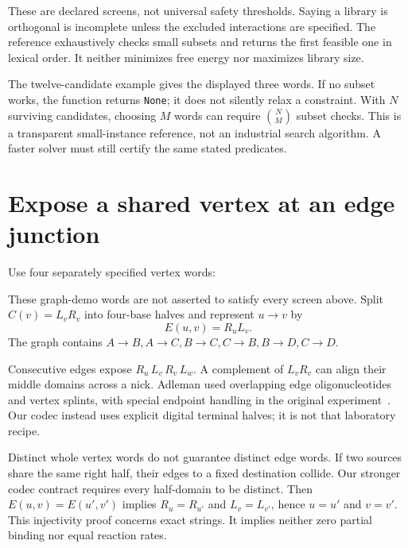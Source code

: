 These are declared screens, not universal safety thresholds. Saying a library
is orthogonal is incomplete unless the excluded interactions are specified.
The reference exhaustively checks small subsets and returns the first feasible
one in lexical order. It neither minimizes free energy nor maximizes library size.
\begin{center}\end{center}
The twelve-candidate example gives the displayed three words. If no subset
works, the function returns \texttt{None}; it does not silently relax a
constraint. With $N$ surviving candidates, choosing $M$ words can require
$\binom{N}{M}$ subset checks. This is a transparent small-instance reference,
not an industrial search algorithm. A faster solver must still certify the
same stated predicates.

\section{Expose a shared vertex at an edge junction}
Use four separately specified vertex words:
\begin{center}\end{center}
These graph-demo words are not asserted to satisfy every screen above.
Split $C(v)=L_vR_v$ into four-base halves and represent $u\to v$ by
\begin{equation}
 E(u,v)=R_uL_v.
\end{equation}
The graph contains $A\to B,A\to C,B\to C,C\to B,B\to D,C\to D$.
\begin{center}\end{center}
Consecutive edges expose $R_u\,L_v\,R_v\,L_w$. A complement of $L_vR_v$
can align their middle domains across a nick. Adleman used overlapping
edge oligonucleotides and vertex splints, with special endpoint handling
in the original experiment~\cite{Adleman1994}. Our codec instead uses explicit
digital terminal halves; it is not that laboratory recipe.

Distinct whole vertex words do not guarantee distinct edge words. If two
sources share the same right half, their edges to a fixed destination collide.
Our stronger codec contract requires every half-domain to be distinct.
Then $E(u,v)=E(u',v')$ implies $R_u=R_{u'}$ and $L_v=L_{v'}$,
hence $u=u'$ and $v=v'$. This injectivity proof concerns exact strings.
It implies neither zero partial binding nor equal reaction rates.

